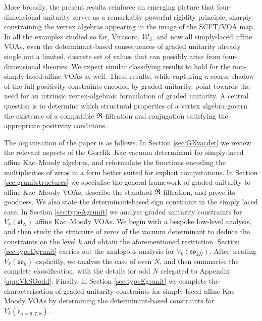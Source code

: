 More broadly, the present results reinforce an emerging picture that four-dimensional unitarity serves as a remarkably powerful rigidity principle, sharply constraining the vertex algebras appearing in the image of the SCFT/VOA map. In all the examples studied so far, Virasoro, $\mathcal{W}_3$, and now all simply-laced affine VOAs, even the determinant-based consequences of graded unitarity already single out a limited, discrete set of values that can possibly arise from four-dimensional theories. We expect similar classifying results to hold for the non-simply laced affine VOAs as well. These results, while capturing a coarse shadow of the full positivity constraints encoded by graded unitarity, point towards the need for an intrinsic vertex-algebraic formulation of graded unitarity. A central question is to determine which structural properties of a vertex algebra govern the existence of a compatible $\mathfrak{R}$-filtration and conjugation satisfying the appropriate positivity conditions. 

The organisation of the paper is as follows. In Section \ref{sec:GKvacdet} we review the relevant aspects of the Gorelik--Kac vacuum determinant for simply-laced affine Kac--Moody algebras, and reformulate the functions encoding the multiplicities of zeros in a form better suited for explicit computations. In Section \ref{sec:grunitstructures} we specialise the general framework of graded unitarity to affine Kac--Moody VOAs, describe the standard $\mathfrak{R}$-filtration, and prove its goodness. We also state the determinant-based sign constraint in the simply laced case. In Section \ref{sec:typeAgrunit} we analyse graded unitarity constraints for $V_k(\mathfrak{sl}_N)$ affine Kac--Moody VOAs. We begin with a bespoke low-level analysis, and then study the structure of zeros of the vacuum determinant to deduce the constraints on the level $k$ and obtain the aforementioned restriction. Section \ref{sec:typeDgrunit} carries out the analogous analysis for $V_k(\mathfrak{so}_{2N})$. After treating $V_k(\mathfrak{so}_8)$ explicitly, we analyse the case of even $N$, and then summarise the complete classification, with the details for odd $N$ relegated to Appendix \ref{app:VkSOodd}. Finally, in Section \ref{sec:typeEgrunit} we complete the characterisation of graded unitarity constraints for simply-laced affine Kac--Moody VOAs by determining the determinant-based constraints for $V_k(\mathfrak{e}_{n=6,7,8})$. 